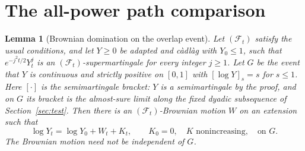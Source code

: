 \documentclass[11pt]{article}
\newtheorem{lemma}{Lemma}[section]
\theoremstyle{definition}
\theoremstyle{remark}
\begin{document}
\section{The all-power path comparison}\label{app:statistical}

\begin{lemma}[Brownian domination on the overlap event]\label{lem:path}
Let $(\mathcal F_t)$ satisfy the usual conditions, and let $Y\ge0$ be adapted and c\`adl\`ag with $Y_0\le1$, such that $e^{-j^2t/2}Y_t^j$ is an $(\mathcal F_t)$-supermartingale for every integer $j\ge1$. Let $G$ be the event that $Y$ is continuous and strictly positive on $[0,1]$ with $[\log Y]_s=s$ for $s\le1$. Here $[\cdot]$ is the semimartingale bracket: $Y$ is a semimartingale by the proof, and on $G$ its bracket is the almost-sure limit along the fixed dyadic subsequence of Section~\ref{sec:test}. Then there is an $(\mathcal F_t)$-Brownian motion $W$ on an extension such that
\[
 \log Y_t=\log Y_0+W_t+K_t,\qquad K_0=0,
 \quad K\text{ nonincreasing},\quad\text{on }G.
\]
The Brownian motion need not be independent of $G$.
\end{lemma}
\end{document}
